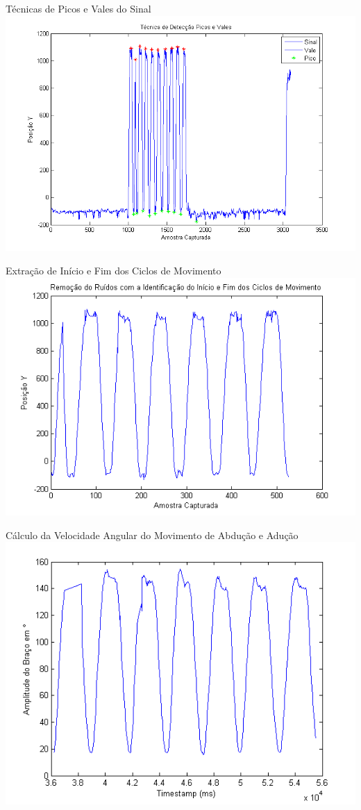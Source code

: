 \documentclass{beamer}
\begin{document}
\begin{frame}{Técnicas de Picos e Vales do Sinal}
      \center \includegraphics[height=3 in]{img/deteccaopicosvales.png}
\end{frame}

\begin{frame}{Extração de Início e Fim dos Ciclos de Movimento}
      \center \includegraphics[height=2.8 in]{img/remocaoruidociclo.png}
\end{frame}




\begin{frame}{Cálculo da Velocidade Angular do Movimento de Abdução e Adução}
      \center \includegraphics[height=2.8 in]{img/amplitude-braco.png}
\end{frame}
\end{document}
